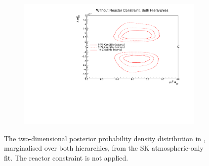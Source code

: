 \begin{figure}[h]
  \begin{subfigure}[t]{0.98\textwidth}
    \includegraphics[width=\textwidth, trim={0mm 0mm 0mm 0mm}, clip,page=1]{Figures/OA/SKOnlyFit/Contours_2D_th23_dm32_BH_0_woRC_UnSmeared_CredibleInterval.pdf}
  \end{subfigure}
  \caption{The two-dimensional posterior probability density distribution in , marginalised over both hierarchies, from the SK atmospheric-only fit. The reactor constraint is not applied.}
  \label{fig:OscillationAnalysis_SKOnly_DM32TH23}
\end{figure}

